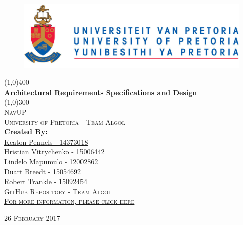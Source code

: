 \documentclass{article}
\begin{document}
	\begin{titlepage}
		\begin{center}

			\begin{figure}
				\includegraphics[width=\linewidth]{images/logo.jpg}	
			\end{figure}

			\line(1,0){400}\\
			[6mm]
			\huge{
				\bfseries Architectural Requirements Specifications and Design
			}\\
			[2mm]
			\line(1,0){300}\\
			[10mm]
			\textsc{\large NavUP}\\
			[7.5mm]
			\textsc{\large University of Pretoria - Team Algol}\\
			[10mm]
			\large{\textbf{Created By:}}\\
			[2mm]
			\href{https://github.com/KeatonPennels}{Keaton Pennels - 14373018}\\
			\href{https://github.com/Chris19951225}{Hristian Vitrychenko - 15006442}\\
      \href{https://github.com/lindelo}{Lindelo Mapumulo - 12002862}\\
			\href{https://github.com/DuartBreedt}{Duart Breedt - 15054692}\\
			\href{https://github.com/roberttrankle}{Robert Trankle - 15092454}\\[5mm]


		\href{https://github.com/Chris19951225/COS-301-Team-Algol}{\textsc{\Large GitHub Repository - Team Algol}}
		\\
		\href{https://github.com/Chris19951225/COS-301-Team-Algol}{\textsc {For more information, please click here}}
		  
		\end{center}
		\begin{flushright}
			\textsc{\large 26 February 2017}
		\end{flushright}
	\end{titlepage}

	\cleardoublepage
	\thispagestyle{empty}
	\tableofcontents
	\cleardoublepage
\end{document}
